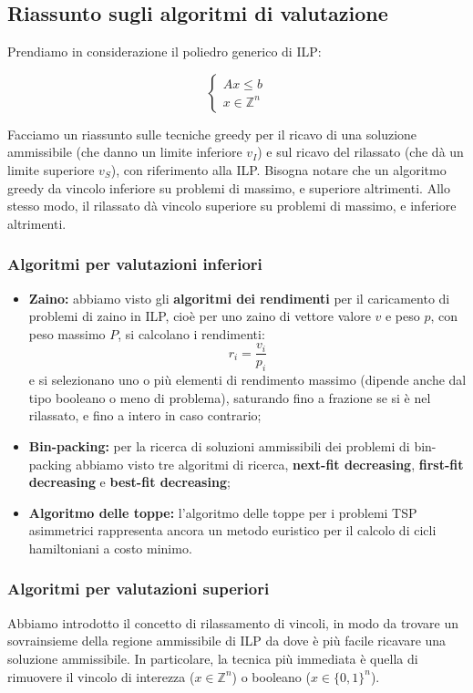 \documentclass[a4paper,11pt]{article}
\begin{document}
\subsection{Riassunto sugli algoritmi di valutazione}

Prendiamo in considerazione il poliedro generico di ILP:

\[
	\begin{cases}
		Ax \leq b \\ 
		x \in \mathbb{Z}^n
	\end{cases}
\]

Facciamo un riassunto sulle tecniche greedy per il ricavo di una soluzione ammissibile (che danno un limite inferiore $v_I$) e sul ricavo del rilassato (che dà un limite superiore $v_S$), con riferimento alla ILP.
Bisogna notare che un algoritmo greedy da vincolo inferiore su problemi di massimo, e superiore altrimenti.
Allo stesso modo, il rilassato dà vincolo superiore su problemi di massimo, e inferiore altrimenti.

\subsubsection{Algoritmi per valutazioni inferiori}
\begin{itemize}
	\item \textbf{Zaino:} abbiamo visto gli \textbf{algoritmi dei rendimenti} per il caricamento di problemi di zaino in ILP, cioè per uno zaino di vettore valore $v$ e peso $p$, con peso massimo $P$, si calcolano i rendimenti:
		$$
		r_i = \frac{v_i}{p_i}
		$$
		e si selezionano uno o più elementi di rendimento massimo (dipende anche dal tipo booleano o meno di problema), saturando fino a frazione se si è nel rilassato, e fino a intero in caso contrario;
	\item \textbf{Bin-packing:} per la ricerca di soluzioni ammissibili dei problemi di bin-packing abbiamo visto tre algoritmi di ricerca, \textbf{next-fit decreasing}, \textbf{first-fit decreasing} e \textbf{best-fit decreasing};
	\item \textbf{Algoritmo delle toppe:} l'algoritmo delle toppe per i problemi TSP asimmetrici rappresenta ancora un metodo euristico per il calcolo di cicli hamiltoniani a costo minimo. 
\end{itemize}

\subsubsection{Algoritmi per valutazioni superiori}
Abbiamo introdotto il concetto di rilassamento di vincoli, in modo da trovare un sovrainsieme della regione ammissibile di ILP da dove è più facile ricavare una soluzione ammissibile.
In particolare, la tecnica più immediata è quella di rimuovere il vincolo di interezza ($x \in \mathbb{Z}^n$) o booleano ($x \in \{0, 1\}^n$).
\end{document}

